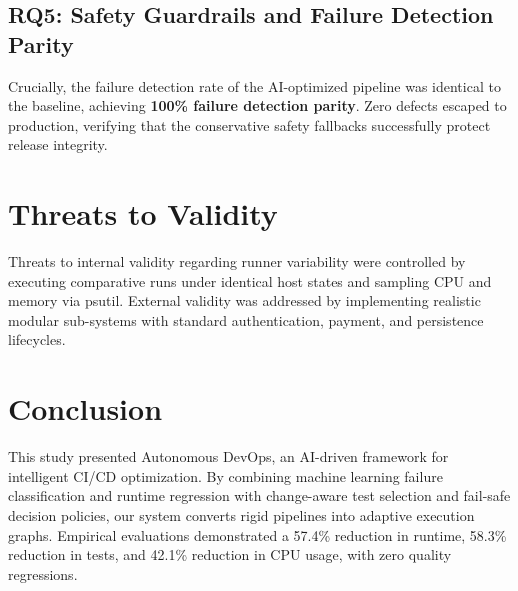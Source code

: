 \documentclass[conference]{IEEEtran}
\begin{document}
\subsection{RQ5: Safety Guardrails and Failure Detection Parity}
Crucially, the failure detection rate of the AI-optimized pipeline was identical to the baseline, achieving \textbf{100\% failure detection parity}. Zero defects escaped to production, verifying that the conservative safety fallbacks successfully protect release integrity.

\section{Threats to Validity}
Threats to internal validity regarding runner variability were controlled by executing comparative runs under identical host states and sampling CPU and memory via psutil. External validity was addressed by implementing realistic modular sub-systems with standard authentication, payment, and persistence lifecycles.

\section{Conclusion}
This study presented Autonomous DevOps, an AI-driven framework for intelligent CI/CD optimization. By combining machine learning failure classification and runtime regression with change-aware test selection and fail-safe decision policies, our system converts rigid pipelines into adaptive execution graphs. Empirical evaluations demonstrated a 57.4\% reduction in runtime, 58.3\% reduction in tests, and 42.1\% reduction in CPU usage, with zero quality regressions.



\end{document}
